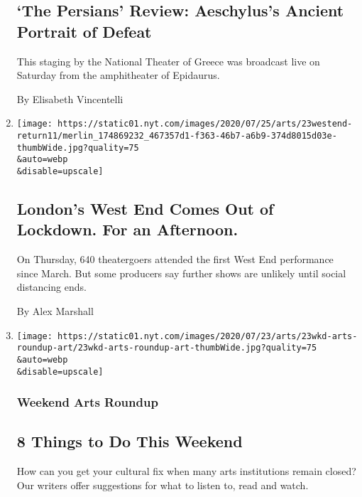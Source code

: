 \begin{enumerate}
{  \subsection{`The Persians' Review: Aeschylus's Ancient Portrait of
  Defeat}\label{the-persians-review-aeschyluss-ancient-portrait-of-defeat}}

  This staging by the National Theater of Greece was broadcast live on
  Saturday from the amphitheater of Epidaurus.

  By Elisabeth Vincentelli
\item
  \href{/2020/07/23/theater/west-end-london-virus.html}{}

  \texttt{[image: https://static01.nyt.com/images/2020/07/25/arts/23westend-return11/merlin\_174869232\_467357d1-f363-46b7-a6b9-374d8015d03e-thumbWide.jpg?quality=75\\\&auto=webp\\\&disable=upscale]}

  \hypertarget{londons-west-end-comes-out-of-lockdown-for-an-afternoon}{%
  \subsection{London's West End Comes Out of Lockdown. For an
  Afternoon.}\label{londons-west-end-comes-out-of-lockdown-for-an-afternoon}}

  On Thursday, 640 theatergoers attended the first West End performance
  since March. But some producers say further shows are unlikely until
  social distancing ends.

  By Alex Marshall
\item
  \href{/2020/07/23/arts/things-to-do-weekend-coronavirus.html}{}

  \texttt{[image: https://static01.nyt.com/images/2020/07/23/arts/23wkd-arts-roundup-art/23wkd-arts-roundup-art-thumbWide.jpg?quality=75\\\&auto=webp\\\&disable=upscale]}

  \hypertarget{weekend-arts-roundup}{%
  \subsubsection{Weekend Arts Roundup}\label{weekend-arts-roundup}}

  \hypertarget{8-things-to-do-this-weekend}{%
  \subsection{8 Things to Do This
  Weekend}\label{8-things-to-do-this-weekend}}

  How can you get your cultural fix when many arts institutions remain
  closed? Our writers offer suggestions for what to listen to, read and
  watch.
\end{enumerate}

